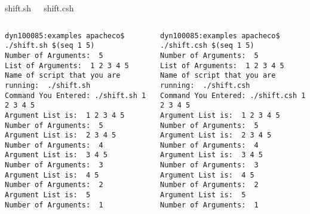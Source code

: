 \documentclass[10pt,t]{beamer}
\begin{document}
\begin{frame}[fragile]
  \begin{columns}
    \vspace{-0.5cm}
    \begin{exampleblock}{shift.sh}
      
    \end{exampleblock}
    \vspace{-0.5cm}
    \begin{block}{shift.csh}
      
    \end{block}
  \end{columns}
  \begin{columns}
      \begin{lstlisting}[style=LINUX,basicstyle=\fontsize{3.5}{4.5}\selectfont\ttfamily]
dyn100085:examples apacheco$ ./shift.sh $(seq 1 5)
Number of Arguments:  5
List of Arguments:  1 2 3 4 5
Name of script that you are running:  ./shift.sh
Command You Entered: ./shift.sh 1 2 3 4 5
Argument List is:  1 2 3 4 5
Number of Arguments:  5
Argument List is:  2 3 4 5
Number of Arguments:  4
Argument List is:  3 4 5
Number of Arguments:  3
Argument List is:  4 5
Number of Arguments:  2
Argument List is:  5
Number of Arguments:  1
      \end{lstlisting}
      \begin{lstlisting}[style=LINUX,basicstyle=\fontsize{3.5}{4.5}\selectfont\ttfamily]
dyn100085:examples apacheco$ ./shift.csh $(seq 1 5)
Number of Arguments:  5
List of Arguments:  1 2 3 4 5
Name of script that you are running:  ./shift.csh
Command You Entered: ./shift.csh 1 2 3 4 5
Argument List is:  1 2 3 4 5
Number of Arguments:  5
Argument List is:  2 3 4 5
Number of Arguments:  4
Argument List is:  3 4 5
Number of Arguments:  3
Argument List is:  4 5
Number of Arguments:  2
Argument List is:  5
Number of Arguments:  1
      \end{lstlisting}
  \end{columns}
\end{frame}
\end{document}
